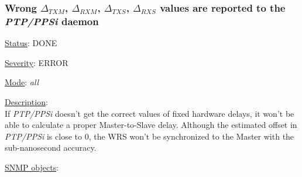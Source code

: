 \subsubsection{\bf Wrong $\Delta_{TXM}$, $\Delta_{RXM}$, $\Delta_{TXS}$,
		$\Delta_{RXS}$ values are reported to the \emph{PTP/PPSi} daemon}
		\label{fail:timing:deltas_report}
		\begin{pck_descr}
			\item [] \underline{Status}: DONE
			\item [] \underline{Severity}: ERROR
			\item [] \underline{Mode}: \emph{all}
			\item [] \underline{Description}:\\
				If \emph{PTP/PPSi} doesn't get the correct values of fixed hardware delays,
				it won't be able to calculate a proper Master-to-Slave delay. Although
				the estimated offset in \emph{PTP/PPSi} is close to 0, the WRS won't be
				synchronized to the Master with the sub-nanosecond accuracy.
			\item [] \underline{SNMP objects}:\\
        {\footnotesize
				\\
				\\
				\\
				\\
				\\
				 \\
         }
		\end{pck_descr}

